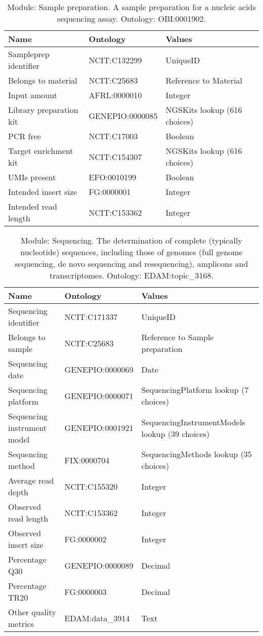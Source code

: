 \documentclass{article}
\begin{document}
\begin{table}[htb]
\begin{tabular}{lll}
Name & Ontology & Values \\
\hline
Sampleprep identifier & NCIT:C132299 & UniqueID \\
Belongs to material & NCIT:C25683 & Reference to Material \\
Input amount & AFRL:0000010 & Integer \\
Library preparation kit & GENEPIO:0000085 & NGSKits lookup (616 choices) \\
PCR free & NCIT:C17003 & Boolean \\
Target enrichment kit & NCIT:C154307 & NGSKits lookup (616 choices) \\
UMIs present & EFO:0010199 & Boolean \\
Intended insert size & FG:0000001 & Integer \\
Intended read length & NCIT:C153362 & Integer \\
\hline
\end{tabular}
\caption[Module: Sample preparation]{\label{table:table8} Module: Sample preparation. A sample preparation for a nucleic acids sequencing assay. Ontology: OBI:0001902. }
\end{table}

\begin{table}[htb]
\begin{tabular}{lll}
Name & Ontology & Values \\
\hline
Sequencing identifier & NCIT:C171337 & UniqueID \\
Belongs to sample & NCIT:C25683 & Reference to Sample preparation \\
Sequencing date & GENEPIO:0000069 & Date \\
Sequencing platform & GENEPIO:0000071 & SequencingPlatform lookup (7 choices) \\
Sequencing instrument model & GENEPIO:0001921 & SequencingInstrumentModels lookup (39 choices) \\
Sequencing method & FIX:0000704 & SequencingMethods lookup (35 choices) \\
Average read depth & NCIT:C155320 & Integer \\
Observed read length & NCIT:C153362 & Integer \\
Observed insert size & FG:0000002 & Integer \\
Percentage Q30 & GENEPIO:0000089 & Decimal \\
Percentage TR20 & FG:0000003 & Decimal \\
Other quality metrics & EDAM:data\_3914 & Text \\
\hline
\end{tabular}
\caption[Module: Sequencing]{\label{table:table9} Module: Sequencing. The determination of complete (typically nucleotide) sequences, including those of genomes (full genome sequencing, de novo sequencing and resequencing), amplicons and transcriptomes. Ontology: EDAM:topic\_3168. }
\end{table}
\end{document}
